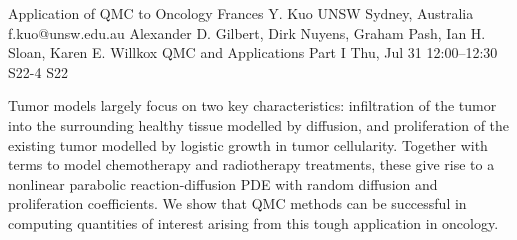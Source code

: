 \begin{talk}
  {Application of QMC to Oncology}%
  {Frances Y. Kuo}%
  {UNSW Sydney, Australia}%
  {f.kuo@unsw.edu.au}%
  {Alexander D. Gilbert, Dirk Nuyens, Graham Pash, Ian H. Sloan, Karen E. Willkox}%
  {QMC and Applications Part I}%
  {Thu, Jul 31 12:00–12:30}%
  {S22-4}%
  {S22}%
				
			
Tumor models largely focus on two key characteristics: infiltration of the tumor into the surrounding healthy tissue modelled by diffusion, and proliferation of the existing tumor modelled by logistic growth in tumor cellularity. Together with terms to model chemotherapy and radiotherapy treatments, these give rise to a nonlinear parabolic reaction-diffusion PDE with random diffusion and proliferation coefficients. We show that QMC methods can be successful in computing quantities of interest arising from this tough application in oncology.

%
%
\end{talk}

